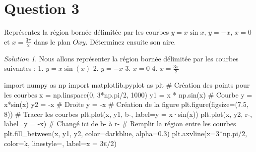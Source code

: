 \documentclass[
  12pt,
  letterpaper,
]{book}
\newenvironment{Shaded}{}{}
\newcommand{\CommentTok}[1]{\textcolor[rgb]{0.42,0.45,0.49}{#1}}
\newcommand{\DecValTok}[1]{\textcolor[rgb]{0.00,0.36,0.77}{#1}}
\newcommand{\FloatTok}[1]{\textcolor[rgb]{0.00,0.36,0.77}{#1}}
\newcommand{\ImportTok}[1]{\textcolor[rgb]{0.01,0.18,0.38}{#1}}
\newcommand{\NormalTok}[1]{\textcolor[rgb]{0.14,0.16,0.18}{#1}}
\newcommand{\OperatorTok}[1]{\textcolor[rgb]{0.14,0.16,0.18}{#1}}
\newcommand{\StringTok}[1]{\textcolor[rgb]{0.01,0.18,0.38}{#1}}
\theoremstyle{remark}
\newtheorem*{solution}{Solution}
\begin{document}
\hypertarget{question-3-2}{%
\section{Question 3}\label{question-3-2}}

Représentez la région bornée délimitée par les courbes \(y=x\sin x\),
\(y=-x\), \(x=0\) et \(x=\tfrac{3\pi}{2}\) dans le plan \(Oxy\).
Déterminez ensuite son aire.

\begin{solution}

Nous allons représenter la région bornée délimitée par les courbes
suivantes : 1. \(y = x\sin(x)\) 2. \(y = -x\) 3. \(x = 0\) 4.
\(x = \frac{3\pi}{2}\)

\begin{Shaded}
\begin{Highlighting}[]
\ImportTok{import}\NormalTok{ numpy }\ImportTok{as}\NormalTok{ np}
\ImportTok{import}\NormalTok{ matplotlib.pyplot }\ImportTok{as}\NormalTok{ plt}
\CommentTok{\# Création des points pour les courbes}
\NormalTok{x }\OperatorTok{=}\NormalTok{ np.linspace(}\DecValTok{0}\NormalTok{, }\DecValTok{3}\OperatorTok{*}\NormalTok{np.pi}\OperatorTok{/}\DecValTok{2}\NormalTok{, }\DecValTok{1000}\NormalTok{)}
\NormalTok{y1 }\OperatorTok{=}\NormalTok{ x }\OperatorTok{*}\NormalTok{ np.sin(x)  }\CommentTok{\# Courbe y = x*sin(x)}
\NormalTok{y2 }\OperatorTok{=} \OperatorTok{{-}}\NormalTok{x             }\CommentTok{\# Droite y = {-}x}
\CommentTok{\# Création de la figure}
\NormalTok{plt.figure(figsize}\OperatorTok{=}\NormalTok{(}\FloatTok{7.5}\NormalTok{, }\DecValTok{8}\NormalTok{))}
\CommentTok{\# Tracer les courbes}
\NormalTok{plt.plot(x, y1, }\StringTok{\textquotesingle{}b{-}\textquotesingle{}}\NormalTok{, label}\OperatorTok{=}\StringTok{\textquotesingle{}y = x·sin(x)\textquotesingle{}}\NormalTok{)}
\NormalTok{plt.plot(x, y2, }\StringTok{\textquotesingle{}r{-}\textquotesingle{}}\NormalTok{, label}\OperatorTok{=}\StringTok{\textquotesingle{}y = {-}x\textquotesingle{}}\NormalTok{)  }\CommentTok{\# Changé ici de \textquotesingle{}b{-}\textquotesingle{} à \textquotesingle{}r{-}\textquotesingle{}}
\CommentTok{\# Remplir la région entre les courbes}
\NormalTok{plt.fill\_between(x, y1, y2, color}\OperatorTok{=}\StringTok{\textquotesingle{}darkblue\textquotesingle{}}\NormalTok{, alpha}\OperatorTok{=}\FloatTok{0.3}\NormalTok{)}
\NormalTok{plt.axvline(x}\OperatorTok{=}\DecValTok{3}\OperatorTok{*}\NormalTok{np.pi}\OperatorTok{/}\DecValTok{2}\NormalTok{, color}\OperatorTok{=}\StringTok{\textquotesingle{}k\textquotesingle{}}\NormalTok{, linestyle}\OperatorTok{=}\StringTok{\textquotesingle{}{-}{-}\textquotesingle{}}\NormalTok{, label}\OperatorTok{=}\StringTok{\textquotesingle{}x = 3π/2\textquotesingle{}}\NormalTok{)}

\end{Highlighting}
\end{Shaded}
\end{solution}
\end{document}
